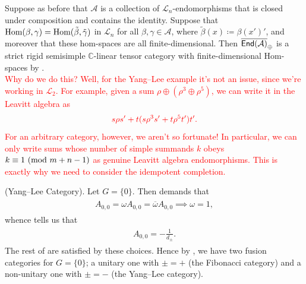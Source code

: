 \noindent Suppose as before that $\mathcal{A}$ is a collection of $\mathcal{L}_n$-endomorphisms that is closed under composition and contains the identity. Suppose that $\textup{Hom}(\beta, \gamma) = \textup{Hom}(\tilde{\beta}, \tilde{\gamma})$ in $\mathcal{L}_n$ for all $\beta, \gamma \in \mathcal{A}$, where $\tilde{\beta}(x) \coloneqq \beta(x')'$, and moreover that these hom-spaces are all finite-dimensional. Then $\overline{\textup{\textsf{End}}(\mathcal{A})}_\oplus$ is a strict rigid semisimple $\mathbb{C}$-linear tensor category with finite-dimensional Hom-spaces by \cite[Lemma 2]{EG17}.\\

\noindent\textcolor{red}{Why do we do this? Well, for the Yang--Lee example it's not an issue, since we're working in $\mathcal{L}_2$. For example, given a sum $\rho \oplus (\rho^3 \oplus \rho^5)$, we can write it in the Leavitt algebra as}
\begin{align*}
\begin{split}
\textcolor{red}{s\rho s' + t(s\rho^3 s' + t\rho^5 t')t'.}
\end{split}
\end{align*}
\noindent\textcolor{red}{For an arbitrary category, however, we aren't so fortunate! In particular, we can only write sums whose number of simple summands $k$ obeys $k \equiv 1\ (\textup{mod }m+n-1)$ as genuine Leavitt algebra endomorphisms. This is exactly why we need to consider the idempotent completion.}
\newpage

\begin{example}\textup{(Yang--Lee Category).} Let $G = \{0\}$. Then \cite[Equation (4.7)]{EG17} demands that
\begin{align*}
\begin{split}
A_{0,0} = \omega A_{0,0} = \overline{\omega}A_{0,0} \implies \omega = 1,
\end{split}
\end{align*}
whence \cite[Equation (4.8)]{EG17} tells us that
\begin{align*}
\begin{split}
A_{0,0} = -\frac{1}{d_\pm}.
\end{split}
\end{align*}
\noindent The rest of \cite[Equations (4.7)--(4.10)]{EG17} are satisfied by these choices. Hence by \cite[Theorem 2]{EG17}, we have two fusion categories for $G = \{0\}$; a unitary one with $\pm = +$ (the Fibonacci category) and a non-unitary one with $\pm = -$ (the Yang--Lee category).\\
\end{example}

